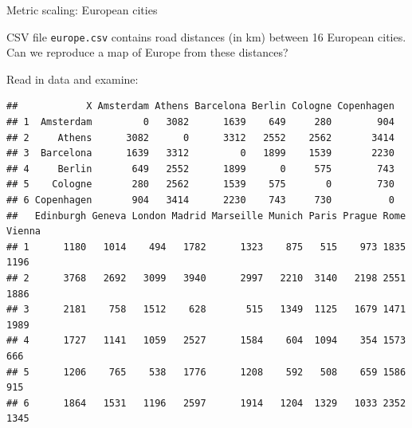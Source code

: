 \begin{frame}[fragile]{Metric scaling: European cities}

CSV file \verb-europe.csv- contains road distances (in km) between 16 European cities. Can we reproduce a map of Europe from these distances?

Read in data and examine:

\begin{knitrout}\scriptsize
{}\color{fgcolor}\begin{kframe}
\begin{alltt}
\hlkwb{=}\hlstd{(}\hlstd{,}
\end{alltt}
\begin{verbatim}
##            X Amsterdam Athens Barcelona Berlin Cologne Copenhagen
## 1  Amsterdam         0   3082      1639    649     280        904
## 2     Athens      3082      0      3312   2552    2562       3414
## 3  Barcelona      1639   3312         0   1899    1539       2230
## 4     Berlin       649   2552      1899      0     575        743
## 5    Cologne       280   2562      1539    575       0        730
## 6 Copenhagen       904   3414      2230    743     730          0
##   Edinburgh Geneva London Madrid Marseille Munich Paris Prague Rome Vienna
## 1      1180   1014    494   1782      1323    875   515    973 1835   1196
## 2      3768   2692   3099   3940      2997   2210  3140   2198 2551   1886
## 3      2181    758   1512    628       515   1349  1125   1679 1471   1989
## 4      1727   1141   1059   2527      1584    604  1094    354 1573    666
## 5      1206    765    538   1776      1208    592   508    659 1586    915
## 6      1864   1531   1196   2597      1914   1204  1329   1033 2352   1345
\end{verbatim}
\end{kframe}
\end{knitrout}


\end{frame}


